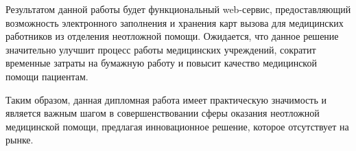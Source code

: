 Результатом данной работы будет функциональный web-сервис, предоставляющий возможность электронного заполнения и хранения карт вызова для медицинских работников из отделения неотложной помощи. Ожидается, что данное решение значительно улучшит процесс работы медицинских учреждений, сократит временные затраты на бумажную работу и повысит качество медицинской помощи пациентам.

Таким образом, данная дипломная работа имеет практическую значимость и является важным шагом в совершенствовании сферы оказания неотложной медицинской помощи, предлагая инновационное решение, которое отсутствует на рынке.
